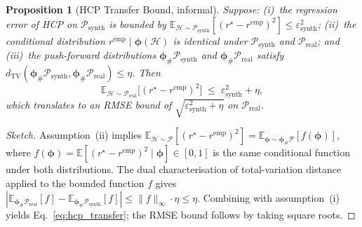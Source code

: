 \documentclass[10pt]{article}
\theoremstyle{plain}
\newtheorem{proposition}{Proposition}
\theoremstyle{definition}
\begin{document}
\begin{proposition}[HCP Transfer Bound, informal]
\label{prop:hcp_transfer}
Suppose: (i)~the regression error of HCP on
$\mathcal{P}_{\mathrm{synth}}$ is bounded by
$\mathbb{E}_{\mathcal{H}\sim\mathcal{P}_{\mathrm{synth}}}
[(r^\star - r^{\mathrm{emp}})^{2}]
 \le\varepsilon_{\mathrm{synth}}^{2}$;
(ii)~the conditional distribution
$r^{\mathrm{emp}}\mid\boldsymbol{\phi}(\mathcal{H})$ is identical
under $\mathcal{P}_{\mathrm{synth}}$ and
$\mathcal{P}_{\mathrm{real}}$; and (iii)~the push-forward
distributions $\boldsymbol{\phi}_\#\mathcal{P}_{\mathrm{synth}}$
and $\boldsymbol{\phi}_\#\mathcal{P}_{\mathrm{real}}$ satisfy
$d_{\mathrm{TV}}(\boldsymbol{\phi}_\#\mathcal{P}_{\mathrm{synth}},
\boldsymbol{\phi}_\#\mathcal{P}_{\mathrm{real}})\le\eta$. Then
\begin{equation}
\mathbb{E}_{\mathcal{H}\sim\mathcal{P}_{\mathrm{real}}}
\big[(r^\star - r^{\mathrm{emp}})^{2}\big]
\;\le\;
\varepsilon_{\mathrm{synth}}^{2} + \eta,
\label{eq:hcp_transfer}
\end{equation}
which translates to an RMSE bound of
$\sqrt{\varepsilon_{\mathrm{synth}}^{2}+\eta}$ on
$\mathcal{P}_{\mathrm{real}}$.
\end{proposition}

\begin{proof}[Sketch]
Assumption~(ii) implies
$\mathbb{E}_{\mathcal{H}\sim\mathcal{P}}
 [(r^\star-r^{\mathrm{emp}})^{2}]
=\mathbb{E}_{\boldsymbol{\phi}\sim
              \boldsymbol{\phi}_\#\mathcal{P}}
 [f(\boldsymbol{\phi})]$,
where $f(\boldsymbol{\phi})=
       \mathbb{E}[(r^\star-r^{\mathrm{emp}})^{2}
                  \mid\boldsymbol{\phi}]\in[0,1]$
is the same conditional function under both distributions. The
dual characterisation of total-variation distance applied to the
bounded function $f$ gives
$|\mathbb{E}_{\boldsymbol{\phi}_\#\mathcal{P}_{\mathrm{real}}}[f]
 -\mathbb{E}_{\boldsymbol{\phi}_\#\mathcal{P}_{\mathrm{synth}}}[f]|
 \le \|f\|_\infty\cdot\eta\le\eta$. Combining with
assumption~(i) yields Eq.~\eqref{eq:hcp_transfer}; the RMSE bound
follows by taking square roots.
\end{proof}
\end{document}
